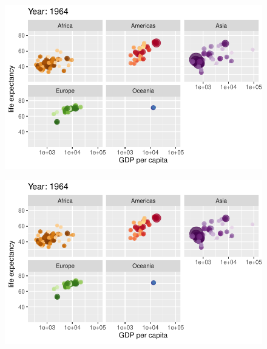 \documentclass[
  letterpaper,
  DIV=11,
  numbers=noendperiod]{scrartcl}
\begin{document}
\begin{figure}[H]

{\centering \includegraphics{class05_files/figure-pdf/unnamed-chunk-24-22.pdf}

}

\end{figure}

\begin{figure}[H]

{\centering \includegraphics{class05_files/figure-pdf/unnamed-chunk-24-23.pdf}

}

\end{figure}
\end{document}
